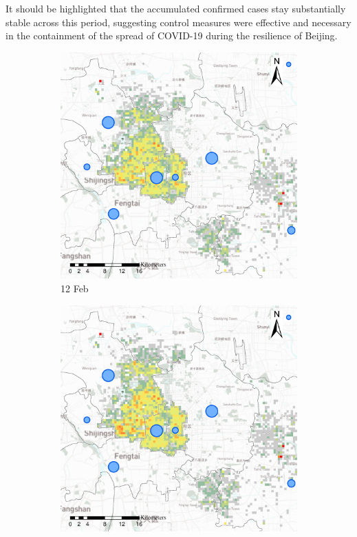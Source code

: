 \documentclass[preprints,ijgi,submit,moreauthors]{Definitions/mdpi}
\begin{document}
It should be highlighted that the accumulated confirmed cases stay substantially stable across this period, suggesting control measures were effective and necessary in the containment of the spread of COVID-19 during the resilience of Beijing.

\begin{figure}[ht]
    \centering
    \begin{subfigure}{.3\textwidth}
        \includegraphics[width=\textwidth]{Figures/Relation_with_confrimed_cases/NewDistrictSSBD2020_02_12.eps}
        \caption{12 Feb}\label{fig:correlation_02_12}
    \end{subfigure}
    \begin{subfigure}{.3\textwidth}
        \includegraphics[width=\textwidth]{Figures/Relation_with_confrimed_cases/NewDistrictSSBD2020_02_17.eps}

\end{subfigure}
\end{figure}
\end{document}
